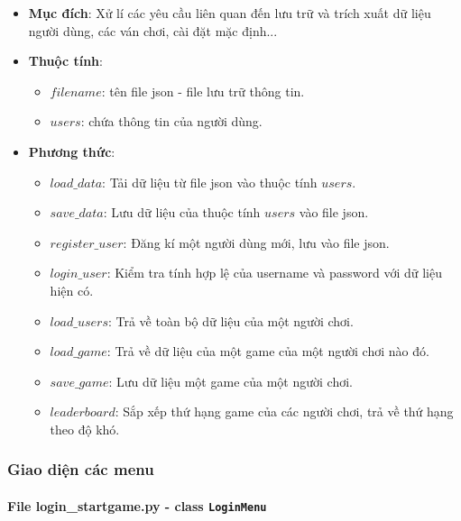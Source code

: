 \begin{itemize}
    \item \textbf{Mục đích}: Xử lí các yêu cầu liên quan đến lưu trữ và trích xuất dữ liệu người dùng, các ván chơi, cài đặt mặc định...
    \item \textbf{Thuộc tính}:
    
    \begin{itemize}
        \item $filename$: tên file json - file lưu trữ thông tin.
        \item $users$: chứa thông tin của người dùng.
    \end{itemize}
    
    \item \textbf{Phương thức}:

    \begin{itemize}
        \item $load\_data$: Tải dữ liệu từ file json vào thuộc tính $users$.
        \item $save\_data$: Lưu dữ liệu của thuộc tính $users$ vào file json.
        \item $register\_user$: Đăng kí một người dùng mới, lưu vào file json.
        \item $login\_user$: Kiểm tra tính hợp lệ của username và password với dữ liệu hiện có.
        \item $load\_users$: Trả về toàn bộ dữ liệu của một người chơi.
        \item $load\_game$: Trả về dữ liệu của một game của một người chơi nào đó.
        \item $save\_game$: Lưu dữ liệu một game của một người chơi.
        \item $leaderboard$: Sắp xếp thứ hạng game của các người chơi, trả về thứ hạng theo độ khó.
    \end{itemize}
    
\end{itemize}

\subsubsection{Giao diện các menu}

\paragraph{File login\_startgame.py - class \texttt{LoginMenu}}

